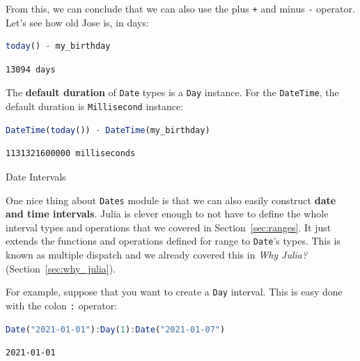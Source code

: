 \documentclass[
  notoc %
]{tufte-book}
\makeatletter
\newcommand{\passthrough}[1]{#1}
\renewcommand\subsubsection{%
\@startsection{subsubsection}{3}{\z@ }{-3.25ex\@plus -1ex \@minus -.2ex}{1.5ex \@plus .2ex}{\normalfont \normalsize \bfseries }
}
\makeatother
\begin{document}
From this, we can conclude that we can also use the plus
\passthrough{\lstinline!+!} and minus \passthrough{\lstinline!-!}
operator. Let's see how old Jose is, in days:

\begin{lstlisting}[language=Julia]
today() - my_birthday
\end{lstlisting}

\begin{lstlisting}[language=Output]
13094 days
\end{lstlisting}

The \textbf{default duration} of \passthrough{\lstinline!Date!} types is
a \passthrough{\lstinline!Day!} instance. For the
\passthrough{\lstinline!DateTime!}, the default duration is
\passthrough{\lstinline!Millisecond!} instance:

\begin{lstlisting}[language=Julia]
DateTime(today()) - DateTime(my_birthday)
\end{lstlisting}

\begin{lstlisting}[language=Output]
1131321600000 milliseconds
\end{lstlisting}

\hypertarget{sec:dates_intervals}{%
\subsubsection{Date Intervals}\label{sec:dates_intervals}}

One nice thing about \passthrough{\lstinline!Dates!} module is that we
can also easily construct \textbf{date and time intervals}. Julia is
clever enough to not have to define the whole interval types and
operations that we covered in Section~\ref{sec:ranges}. It just extends
the functions and operations defined for range to
\passthrough{\lstinline!Date!}'s types. This is known as multiple
dispatch and we already covered this in \emph{Why Julia?}
(Section~\ref{sec:why_julia}).

For example, suppose that you want to create a
\passthrough{\lstinline!Day!} interval. This is easy done with the colon
\passthrough{\lstinline!:!} operator:

\begin{lstlisting}[language=Julia]
Date("2021-01-01"):Day(1):Date("2021-01-07")
\end{lstlisting}

\begin{lstlisting}[language=Output]
2021-01-01
\end{lstlisting}
\end{document}

